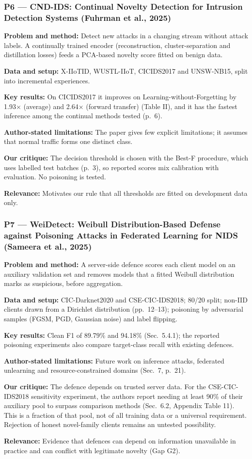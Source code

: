 \documentclass[10pt,a4paper]{article}
\newcommand{\sumitem}[2]{\noindent\textbf{#1:} #2\par}
\begin{document}
\subsubsection*{P6 --- CND-IDS: Continual Novelty Detection for Intrusion Detection Systems (Fuhrman et al., 2025)}
\sumitem{Problem and method}{Detect new attacks in a changing stream without attack labels. A continually trained encoder (reconstruction, cluster-separation and distillation losses) feeds a PCA-based novelty score fitted on benign data.}
\sumitem{Data and setup}{X-IIoTID, WUSTL-IIoT, CICIDS2017 and UNSW-NB15, split into incremental experiences.}
\sumitem{Key results}{On CICIDS2017 it improves on Learning-without-Forgetting by 1.93$\times$ (average) and 2.64$\times$ (forward transfer) (Table II), and it has the fastest inference among the continual methods tested (p.~6).}
\sumitem{Author-stated limitations}{The paper gives few explicit limitations; it assumes that normal traffic forms one distinct class.}
\sumitem{Our critique}{The decision threshold is chosen with the Best-F procedure, which uses labelled test batches (p.~3), so reported scores mix calibration with evaluation. No poisoning is tested.}
\sumitem{Relevance}{Motivates our rule that all thresholds are fitted on development data only.}

\subsubsection*{P7 --- WeiDetect: Weibull Distribution-Based Defense against Poisoning Attacks in Federated Learning for NIDS (Sameera et al., 2025)}
\sumitem{Problem and method}{A server-side defence scores each client model on an auxiliary validation set and removes models that a fitted Weibull distribution marks as suspicious, before aggregation.}
\sumitem{Data and setup}{CIC-Darknet2020 and CSE-CIC-IDS2018; 80/20 split; non-IID clients drawn from a Dirichlet distribution (pp.~12--13); poisoning by adversarial samples (FGSM, PGD, Gaussian noise) and label flipping.}
\sumitem{Key results}{Clean F1 of 89.79\% and 94.18\% (Sec.~5.4.1); the reported poisoning experiments also compare target-class recall with existing defences.}
\sumitem{Author-stated limitations}{Future work on inference attacks, federated unlearning and resource-constrained domains (Sec.~7, p.~21).}
\sumitem{Our critique}{The defence depends on trusted server data. For the CSE-CIC-IDS2018 sensitivity experiment, the authors report needing at least 90\% of their auxiliary pool to surpass comparison methods (Sec.~6.2, Appendix Table 11). This is a fraction of that pool, not of all training data or a universal requirement. Rejection of honest novel-family clients remains an untested possibility.}
\sumitem{Relevance}{Evidence that defences can depend on information unavailable in practice and can conflict with legitimate novelty (Gap G2).}
\end{document}
